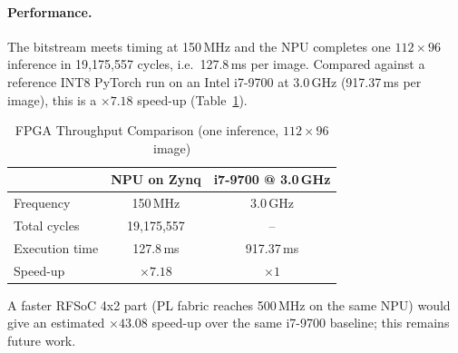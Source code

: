 \paragraph{Performance.}
The bitstream meets timing at 150\,MHz and the NPU completes one $112\times96$ inference in 19{,}175{,}557 cycles, i.e.\ 127.8\,ms per image. Compared against a reference INT8 PyTorch run on an Intel i7-9700 at 3.0\,GHz (917.37\,ms per image), this is a $\times7.18$ speed-up (Table~\ref{tab:fpga_speedup}).

\begin{table}[H]
\centering
\caption{FPGA Throughput Comparison (one inference, $112\times96$ image)}
\label{tab:fpga_speedup}
\begin{tabular}{lcc}
\toprule
 & \textbf{NPU on Zynq} & \textbf{i7-9700 @ 3.0\,GHz} \\
\midrule
Frequency        & 150\,MHz       & 3.0\,GHz \\
Total cycles     & 19{,}175{,}557 & -- \\
Execution time   & 127.8\,ms      & 917.37\,ms \\
Speed-up         & $\times7.18$   & $\times1$ \\
\bottomrule
\end{tabular}
\end{table}

A faster RFSoC 4x2 part (PL fabric reaches 500\,MHz on the same NPU) would give an estimated $\times43.08$ speed-up over the same i7-9700 baseline; this remains future work.
